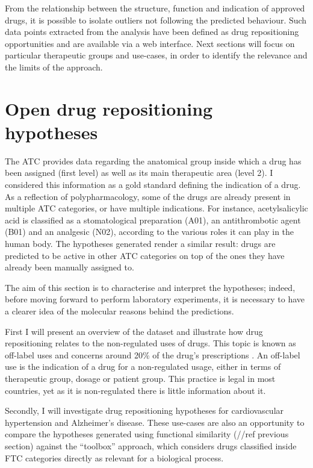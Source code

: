 From the relationship between the structure, function and indication of approved drugs, it is possible to isolate outliers not following the predicted behaviour. Such data points extracted from the analysis have been defined as drug repositioning opportunities and are available via a web interface. Next sections will focus on particular therapeutic groups and use-cases, in order to identify the relevance and the limits of the approach.

\section{Open drug repositioning hypotheses}
The ATC provides data regarding the anatomical group inside which a drug has been assigned (first level) as well as its main therapeutic area (level 2). I considered this information as a gold standard defining the indication of a drug. As a reflection of polypharmacology, some of the drugs are already present in multiple ATC categories, or have multiple indications. For instance, acetylsalicylic acid is classified as a stomatological preparation (A01), an antithrombotic agent (B01) and an analgesic (N02), according to the various roles it can play in the human body. The hypotheses generated render a similar result: drugs are predicted to be active in other ATC categories on top of the ones they have already been manually assigned to.

The aim of this section is to characterise and interpret the hypotheses; indeed, before moving forward to perform laboratory experiments, it is necessary to have a clearer idea of the molecular reasons behind the predictions.

First I will present an overview of the dataset and illustrate how drug repositioning relates to the non-regulated uses of drugs. This topic is known as off-label uses \citep{offlabelwiki} and concerns around 20\% of the drug’s prescriptions \citep{stafford2008regulating}. An off-label use is the indication of a drug for a non-regulated usage, either in terms of therapeutic group, dosage or patient group. This practice is legal in most countries, yet as it is non-regulated there is little information about it.

Secondly, I will investigate drug repositioning hypotheses for cardiovascular hypertension and Alzheimer's disease. These use-cases are also an opportunity to compare the hypotheses generated using functional similarity (//ref previous section) against the “toolbox” approach, which considers drugs classified inside FTC categories directly as relevant for a biological process.


